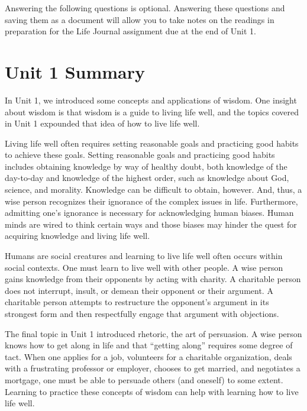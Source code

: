 \documentclass[
]{book}
\begin{document}
\begin{reflect}
Answering the following questions is optional. Answering these questions and saving them as a document will allow you to take notes on the readings in preparation for the Life Journal assignment due at the end of Unit 1.
\end{reflect}

\hypertarget{unit-1-summary}{%
\section*{Unit 1 Summary}\label{unit-1-summary}}

In Unit 1, we introduced some concepts and applications of wisdom. One insight about wisdom is that wisdom is a guide to living life well, and the topics covered in Unit 1 expounded that idea of how to live life well.

Living life well often requires setting reasonable goals and practicing good habits to achieve these goals. Setting reasonable goals and practicing good habits includes obtaining knowledge by way of healthy doubt, both knowledge of the day-to-day and knowledge of the highest order, such as knowledge about God, science, and morality. Knowledge can be difficult to obtain, however. And, thus, a wise person recognizes their ignorance of the complex issues in life. Furthermore, admitting one's ignorance is necessary for acknowledging human biases. Human minds are wired to think certain ways and those biases may hinder the quest for acquiring knowledge and living life well.

Humans are social creatures and learning to live life well often occurs within social contexts. One must learn to live well with other people. A wise person gains knowledge from their opponents by acting with charity. A charitable person does not interrupt, insult, or demean their opponent or their argument. A charitable person attempts to restructure the opponent's argument in its strongest form and then respectfully engage that argument with objections.

The final topic in Unit 1 introduced rhetoric, the art of persuasion. A wise person knows how to get along in life and that ``getting along'' requires some degree of tact. When one applies for a job, volunteers for a charitable organization, deals with a frustrating professor or employer, chooses to get married, and negotiates a mortgage, one must be able to persuade others (and oneself) to some extent. Learning to practice these concepts of wisdom can help with learning how to live life well.
\end{document}
